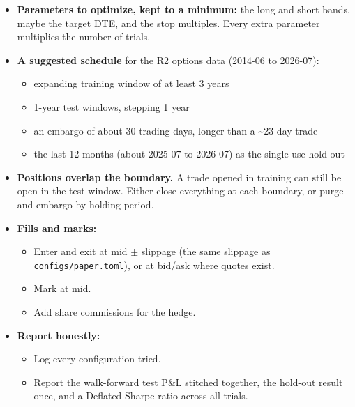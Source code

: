 \documentclass{article}
\begin{document}
\begin{itemize}
\item \textbf{Parameters to optimize, kept to a minimum:} the long and short bands, maybe the target DTE, and the stop multiples. Every extra parameter multiplies the number of trials.

\item \textbf{A suggested schedule} for the R2 options data (2014-06 to 2026-07):

\begin{itemize}

\item expanding training window of at least 3 years

\item 1-year test windows, stepping 1 year

\item an embargo of about 30 trading days, longer than a \textasciitilde{}23-day trade

\item the last 12 months (about 2025-07 to 2026-07) as the single-use hold-out

\end{itemize}

\item \textbf{Positions overlap the boundary.} A trade opened in training can still be open in the test window. Either close everything at each boundary, or purge and embargo by holding period.

\item \textbf{Fills and marks:}

\begin{itemize}

\item Enter and exit at mid \ensuremath{\pm} slippage (the same slippage as \texttt{configs/\allowbreak{}paper.\allowbreak{}toml}), or at bid/\allowbreak{}ask where quotes exist.

\item Mark at mid.

\item Add share commissions for the hedge.

\end{itemize}

\item \textbf{Report honestly:}

\begin{itemize}

\item Log every configuration tried.

\item Report the walk-forward test P\&L stitched together, the hold-out result once, and a Deflated Sharpe ratio across all trials.

\end{itemize}

\end{itemize}
\end{document}
